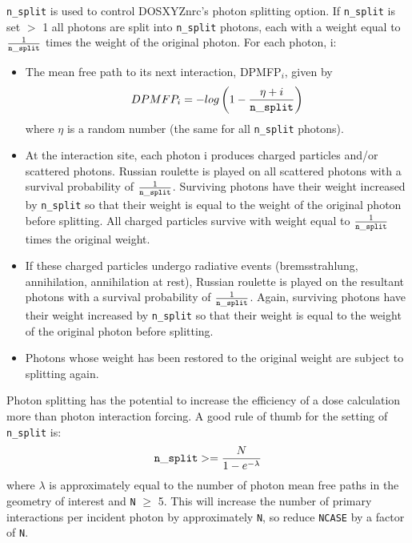 \documentclass[12pt,twoside]{article}      %
\begin{document}
{\tt n\_split} is used to control DOSXYZnrc's photon splitting option.
If {\tt n\_split} is set $>$ 1 all photons are split
into {\tt n\_split} photons, each with a weight equal to
$\frac{1}{{\tt n\_split}}$ times the weight of the original photon.  For each
photon, i:
\begin{itemize}
\item The mean free path to its next interaction, DPMFP$_i$, given by
\begin{equation}
DPMFP_i=-log\left(1-\frac{\eta+i}{{\tt n\_split}}\right)
\end{equation}
where $\eta$ is a random number (the same for all {\tt n\_split} photons).
\item At the interaction site, each photon i produces charged particles and/or
scattered
photons.  Russian roulette is played on all scattered photons with a
survival probability of $\frac{1}{{\tt n\_split}}$.  Surviving photons
have their weight increased by {\tt n\_split} so that their weight is equal
to the weight of the
original photon before splitting.  All charged particles survive with weight equal
to $\frac{1}{{\tt n\_split}}$ times the original weight.
\item If these charged particles undergo radiative events (bremsstrahlung,
  annihilation, annihilation at rest), Russian roulette is played on the
  resultant photons with a survival probability of $\frac{1}{{\tt n\_split}}$.  Again,
  surviving photons have their weight increased by {\tt n\_split} so that their
  weight is equal to the weight of the original photon before splitting.
\item Photons whose weight has been restored to the original weight are
  subject to splitting again.
\end{itemize}

Photon splitting has the potential to increase the efficiency of a dose
calculation more than photon interaction forcing.  A good rule of thumb for
the setting of {\tt n\_split} is:
\begin{equation}
{\tt n\_split}>=\frac{N}{1-e^{-\lambda}}
\end{equation}
where $\lambda$ is approximately equal to the number of photon mean free paths
in the geometry of interest and {\tt N} $\geq$ 5.  This will increase the
number of primary interactions per incident photon by approximately {\tt N},
so reduce {\tt NCASE} by a factor of {\tt N}.
\end{document}
